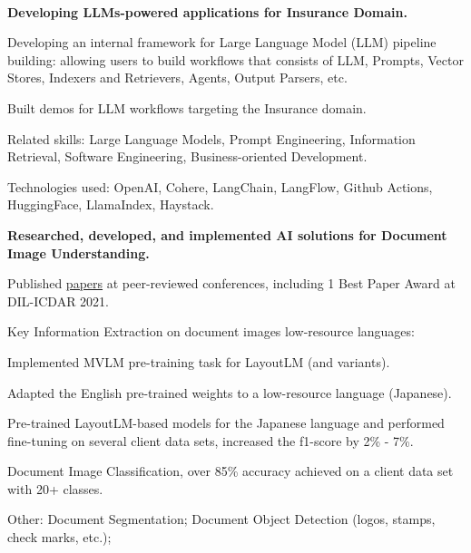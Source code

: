 \\
\begin{xitemize}
    \item \textbf{Developing LLMs-powered applications for Insurance Domain.}
    \begin{zitemize}
        \item Developing an internal framework for Large Language Model (LLM) pipeline building: allowing
        users to build workflows that consists of LLM, Prompts, Vector Stores, Indexers and Retrievers,
        Agents, Output Parsers, etc.
        \item Built demos for LLM workflows targeting the Insurance domain.
        \item Related skills: Large Language Models, Prompt Engineering, Information Retrieval, Software
        Engineering, Business-oriented Development.
        \item Technologies used: OpenAI, Cohere, LangChain, LangFlow, Github Actions, HuggingFace, LlamaIndex, Haystack.
    \end{zitemize}
    \item \textbf{Researched, developed, and implemented AI solutions for Document Image Understanding.}
    \begin{zitemize}
        \item Published \href{https://scholar.google.com/citations?user=\gscholarid}{papers} at
        peer-reviewed conferences, including 1 Best Paper Award at DIL-ICDAR 2021.
        \item Key Information Extraction on document images low-resource languages:
        \begin{zitemize}
            \item Implemented MVLM pre-training task for LayoutLM (and variants).
            \item Adapted the English pre-trained weights to a low-resource language (Japanese).
            \item Pre-trained LayoutLM-based models for the Japanese language and performed fine-tuning on several client data sets, increased the f1-score by 2\% - 7\%.
        \end{zitemize}
        \item Document Image Classification, over 85\% accuracy achieved on a client data set with 20+ classes.
        \item Other: Document Segmentation; Document Object Detection (logos, stamps, check marks, etc.);

\end{zitemize}
\end{xitemize}
